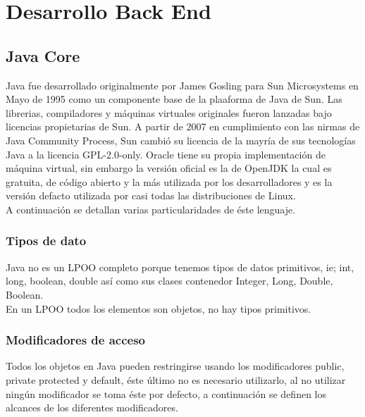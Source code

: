 \documentclass[12pt,article,oneside]{memoir}
\begin{document}
\part{  Desarrollo Back End}
	\chapter{Java Core}	
	Java fue desarrollado originalmente por James Gosling para Sun Microsystems en Mayo de 1995 como un componente base de la 
	plaaforma de Java de Sun. Las librerias, compiladores y m\'aquinas virtuales originales fueron lanzadas bajo licencias 
	propietarias de Sun. A partir de 2007 en cumplimiento con las nirmas de Java Community Process, Sun cambi\'o su licencia 
	de la mayr\'ia de sus tecnolog\'ias Java a la licencia GPL-2.0-only. Oracle tiene su propia implementaci\'on de m\'aquina 
	virtual, sin embargo la versi\'on oficial es la de OpenJDK la cual es gratuita, de c\'odigo abierto y la m\'as utilizada 
	por los desarrolladores y es la versi\'on defacto utilizada por casi todas las distribuciones de Linux.\\
	
	A continuaci\'on se detallan varias particularidades de \'este lenguaje.
	
		\section{Tipos de dato}
		Java no es un LPOO completo porque tenemos tipos de datos primitivos, ie; int, long, boolean, double as\'i como sus 
		clases contenedor Integer, Long, Double, Boolean. \\
		
		En un LPOO todos los elementos son objetos, no hay tipos primitivos.
		
		\section{Modificadores de acceso}
		Todos los objetos en Java pueden restringirse usando los modificadores public, private protected y default, \'este 
		\'ultimo no es necesario utilizarlo, al no utilizar ning\'un modificador se toma \'este por defecto, a continuaci\'on 
		se definen los alcances de los diferentes modificadores.
		
\end{document}
